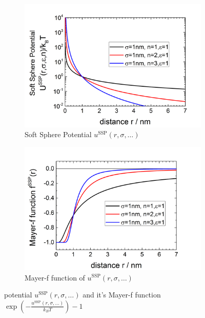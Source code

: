 \begin{figure}[htb]
\centering
\begin{subfigure}[b]{.48\textwidth}
   \centering
   \includegraphics[width=\textwidth]{../images/OZsolver/potentials/potUSoftSphere.png}
   \caption{Soft Sphere Potential $u^\text{SSP}(r,\sigma,\ldots)$}
   \label{fig:OZUSSP}
\end{subfigure}
\hfill
\begin{subfigure}[b]{.48\textwidth}
   \centering
   \includegraphics[width=\textwidth]{../images/OZsolver/potentials/potfSoftSphere.png}
   \caption{Mayer-f function of $u^\text{SSP}(r,\sigma,\ldots)$}
   \label{fig:OZMeyerfSSP}
\end{subfigure}
\caption{potential $u^\text{SSP}(r,\sigma,\ldots)$ and it's Mayer-f function $\exp\left(-\frac{u^\text{SSP}(r,\sigma,\ldots)}{k_BT}\right)-1$}
\end{figure}

